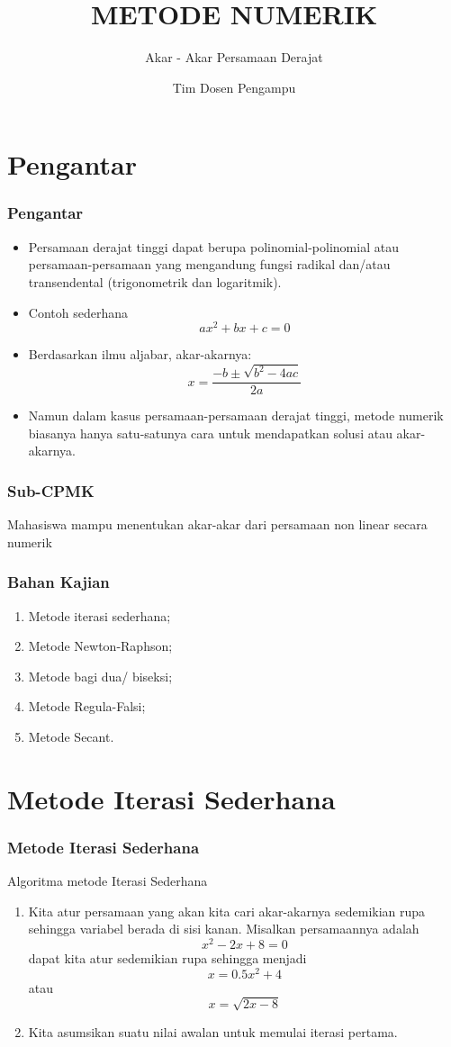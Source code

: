 \documentclass[pdflatex,compress]{beamer}
\title{METODE NUMERIK}
\subtitle{Akar - Akar Persamaan Derajat }
\author{Tim Dosen Pengampu}
\begin{document}
\maketitle

\section{Pengantar}

\begin{frame}
	\frametitle{Pengantar}
	\begin{itemize}
		\item Persamaan derajat tinggi dapat berupa polinomial-polinomial atau persamaan-persamaan yang mengandung fungsi radikal dan/atau transendental (trigonometrik dan logaritmik).
		\item Contoh sederhana
		$$ ax^2 + bx + c = 0 $$
		\item Berdasarkan ilmu aljabar, akar-akarnya:
		$$ x = \frac{-b \pm \sqrt{b^2 - 4ac}}{2a} $$
		\item Namun dalam kasus persamaan-persamaan derajat tinggi, metode numerik biasanya hanya satu-satunya cara untuk mendapatkan solusi atau akar-akarnya.
	\end{itemize}
\end{frame}

\begin{frame}
	\frametitle{Sub-CPMK}
	Mahasiswa mampu menentukan akar-akar dari persamaan non linear secara numerik
\end{frame}

\begin{frame}
	\frametitle{Bahan Kajian}
	\begin{enumerate}
		\item Metode iterasi sederhana;
		\item Metode Newton-Raphson;
		\item Metode bagi dua/ biseksi;
		\item Metode Regula-Falsi;
		\item Metode Secant.
	\end{enumerate}
\end{frame}

\section{Metode Iterasi Sederhana}

\begin{frame}
	\frametitle{Metode Iterasi Sederhana}
	Algoritma metode Iterasi Sederhana
	\begin{enumerate}
		\item Kita atur persamaan yang akan kita cari akar-akarnya sedemikian rupa sehingga variabel berada di sisi kanan. Misalkan persamaannya adalah
		$$ x^2 - 2x + 8 = 0 $$
		dapat kita atur sedemikian rupa sehingga menjadi
		$$ x = 0.5x^2 + 4 $$ atau $$ x = \sqrt{2x-8} $$
		\item Kita asumsikan suatu nilai awalan untuk memulai iterasi pertama.
	\end{enumerate}
\end{frame}
\end{document}
